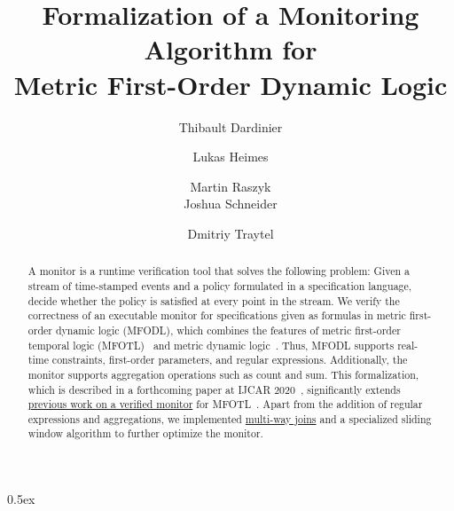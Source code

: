 \documentclass[10pt,a4paper]{article}
\begin{document}
\title{Formalization of a Monitoring Algorithm for\\ Metric First-Order Dynamic Logic}
\author{Thibault Dardinier \and Lukas Heimes \and Martin Raszyk \\ Joshua Schneider \and Dmitriy Traytel}

\maketitle

\begin{abstract}
A monitor is a runtime verification tool that solves the following problem: Given a stream
of time-stamped events and a policy formulated in a specification language, decide
whether the policy is satisfied at every point in the stream. We verify the correctness
of an executable monitor for specifications given as formulas in metric first-order
dynamic logic (MFODL), which combines the features of metric first-order temporal logic
(MFOTL)~\cite{BasinKMZ-JACM15} and metric dynamic logic~\cite{BasinKT-RV17}. Thus, MFODL
supports real-time constraints, first-order parameters, and regular expressions.
Additionally, the monitor supports aggregation operations such as count and sum. This
formalization, which is described in a forthcoming paper at IJCAR
2020~\cite{BasinDHKRST2020IJCAR}, significantly extends
\href{https://www.isa-afp.org/entries/MFOTL_Monitor.html}{previous work on a verified
monitor} for MFOTL~\cite{SchneiderBKT2019RV}. Apart from the addition of regular
expressions and aggregations, we implemented
\href{https://www.isa-afp.org/entries/Generic_Join.html}{multi-way joins} and
a specialized sliding window algorithm to further optimize the monitor.
\end{abstract}

\tableofcontents

\parindent 0pt\parskip 0.5ex





\end{document}
